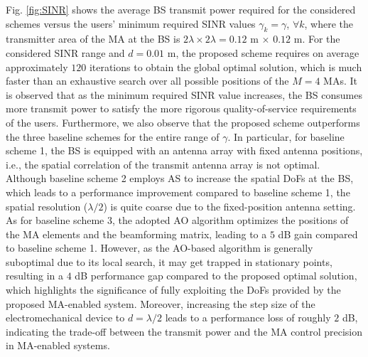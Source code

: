 \documentclass[12pt, draftclsnofoot, onecolumn]{IEEEtran}
\begin{document}
Fig. \ref{fig:SINR} shows the average BS transmit power required for the considered schemes versus the users' minimum required SINR values $\gamma_k=\gamma$, $\forall k$, where the transmitter area of the MA at the BS is $2\lambda\times 2\lambda=0.12$ m $\times$ $0.12$ m. For the considered SINR range and $d=0.01$ m, the proposed scheme requires on average approximately $120$ iterations to obtain the global optimal solution, which is much faster than an exhaustive search over all possible positions of the $M=4$ MAs. It is observed that as the minimum required SINR value increases, the BS consumes more transmit power to satisfy the more rigorous quality-of-service requirements of the users. Furthermore, we also observe that the proposed scheme outperforms the three baseline schemes for the entire range of $\gamma$. In particular, for baseline scheme 1, the BS is equipped with an antenna array with fixed antenna positions, i.e., the spatial correlation of the transmit antenna array is not optimal. Although baseline scheme 2 employs AS to increase the spatial DoFs at the BS, which leads to a performance improvement compared to baseline scheme 1, the spatial resolution ($\lambda/2$) is quite coarse due to the fixed-position antenna setting. As for baseline scheme 3, the adopted AO algorithm optimizes the positions of the MA elements and the beamforming matrix, leading to a $5$ dB gain compared to baseline scheme 1. However, as the AO-based algorithm is generally suboptimal due to its local search, it may get trapped in stationary points, resulting in a $4$ dB performance gap compared to the proposed optimal solution,
 which highlights the significance of fully exploiting the DoFs provided by the proposed MA-enabled system. Moreover, increasing the step size of the electromechanical device to $d=\lambda/2$ leads to a performance loss of roughly $2$ dB, indicating the trade-off between the transmit power and the MA control precision in MA-enabled systems.
\end{document}
